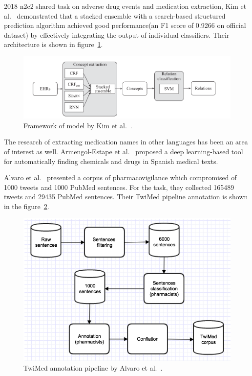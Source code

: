 2018 n2c2 shared task on adverse drug events and medication extraction, Kim et al.~\cite{kim2020ensemble} demonstrated that a stacked ensemble with a search-based structured prediction algorithm achieved good performance(an F1 score of 0.9266 on official dataset) by effectively integrating the output of individual classifiers. Their architecture is shown in figure~\ref{fig:architecture-kim}.

\begin{figure}[h]
	\centering
	\includegraphics[width=0.99\linewidth]{Figures/i.png}
	\caption{Framework of model by Kim et al.~\cite{kim2020ensemble}.}
	\label{fig:architecture-kim}
\end{figure}

The research of extracting medication names in other languages has been an area of interest as well. Armengol-Estape et al.~\cite{armengol2019pharmaconer} proposed a deep learning-based tool for automatically finding chemicals and drugs in Spanish medical texts.


Alvaro et al.~\cite{alvaro2017twimed} presented a corpus of pharmacovigilance which compromised of 1000 tweets and 1000 PubMed sentences. For the task, they collected 165489 tweets and 29435 PubMed sentences. Their TwiMed pipeline annotation is shown in the figure~\ref{fig:architecture-twimed-alvaro}.

\begin{figure}[h]
	\centering
	\includegraphics[width=0.99\linewidth]{Figures/b.png}
	\caption{TwiMed annotation pipeline by Alvaro et al.~\cite{alvaro2017twimed}.}
	\label{fig:architecture-twimed-alvaro}
\end{figure}

